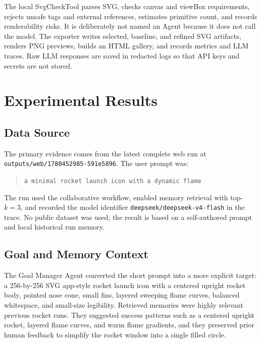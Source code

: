 \documentclass[10pt]{article}
\newcommand{\rundir}{\texttt{outputs/web/1780452985-591e5896}}
\begin{document}
The local SvgCheckTool parses SVG, checks canvas and viewBox requirements, rejects unsafe tags and external references, estimates primitive count, and records renderability risks. It is deliberately not named an Agent because it does not call the model. The exporter writes selected, baseline, and refined SVG artifacts, renders PNG previews, builds an HTML gallery, and records metrics and LLM traces. Raw LLM responses are saved in redacted logs so that API keys and secrets are not stored.

\section{Experimental Results}

\subsection{Data Source}

The primary evidence comes from the latest complete web run at \rundir. The user prompt was:
\begin{quote}
\small
\texttt{a minimal rocket launch icon with a dynamic flame}
\end{quote}
The run used the collaborative workflow, enabled memory retrieval with top-$k=3$, and recorded the model identifier \texttt{deepseek/deepseek-v4-flash} in the trace. No public dataset was used; the result is based on a self-authored prompt and local historical run memory.

\subsection{Goal and Memory Context}

The Goal Manager Agent converted the short prompt into a more explicit target: a 256-by-256 SVG app-style rocket launch icon with a centered upright rocket body, pointed nose cone, small fins, layered sweeping flame curves, balanced whitespace, and small-size legibility. Retrieved memories were highly relevant previous rocket runs. They suggested success patterns such as a centered upright rocket, layered flame curves, and warm flame gradients, and they preserved prior human feedback to simplify the rocket window into a single filled circle.
\end{document}
